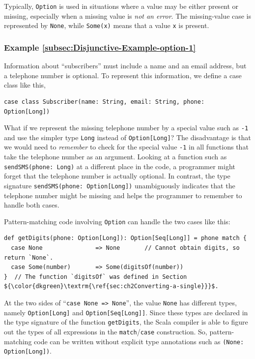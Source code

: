 Typically, \lstinline!Option! is used in situations where a value
may be either present or missing, especially when a missing value
is \emph{not an error}. The missing-value case is represented by \lstinline!None!,
while \lstinline!Some(x)! means that a value \lstinline!x! is present.

\subsubsection{Example \label{subsec:Disjunctive-Example-option-1}\ref{subsec:Disjunctive-Example-option-1}}

Information about ``subscribers'' must include a name and an email
address, but a telephone number is optional. To represent this information,
we define a case class like this,
\begin{lstlisting}
case class Subscriber(name: String, email: String, phone: Option[Long])
\end{lstlisting}
What if we represent the missing telephone number by a special value
such as \lstinline!-1! and use the simpler type \lstinline!Long!
instead of \lstinline!Option[Long]!? The disadvantage is that we
would need to \emph{remember} to check for the special value \lstinline!-1!
in all functions that take the telephone number as an argument. Looking
at a function such as \lstinline!sendSMS(phone: Long)! at a different
place in the code, a programmer might forget that the telephone number
is actually optional. In contrast, the type signature \lstinline!sendSMS(phone: Option[Long])!
unambiguously indicates that the telephone number might be missing
and helps the programmer to remember to handle both cases.

Pattern-matching code involving \lstinline!Option! can handle the
two cases like this:
\begin{lstlisting}[mathescape=true]
def getDigits(phone: Option[Long]): Option[Seq[Long]] = phone match {
  case None               => None       // Cannot obtain digits, so return `None`.
  case Some(number)       => Some(digitsOf(number))
}  // The function `digitsOf` was defined in Section ${\color{dkgreen}\textrm{\ref{sec:ch2Converting-a-single}}}$.
\end{lstlisting}

At the two sides of ``\lstinline!case None => None!'', the value
\lstinline!None! has different types, namely \lstinline!Option[Long]!
and \lstinline!Option[Seq[Long]]!. Since these types are declared
in the type signature of the function \lstinline!getDigits!, the
Scala compiler is able to figure out the types of all expressions
in the \lstinline!match!/\lstinline!case! construction. So, pattern-matching
code can be written without explicit type annotations
such as \lstinline!(None: Option[Long])!.

